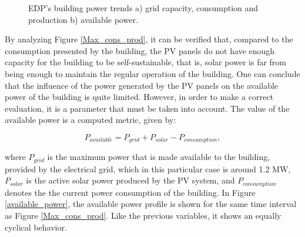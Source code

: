 \begin{figure}[h!]
    \captionsetup[subfigure]{position=b}
    \centering
    \label{fig:ap}
    \caption{EDP's building power trends a) grid capacity, consumption and production b) available power.}
\end{figure}


By analyzing Figure \ref{Max_cons_prod}, it can be verified that, compared to the consumption presented by the building, the \ac{PV} panels do not have enough capacity for the building to be self-sustainable, that is, solar power is far from being enough to maintain the regular operation of the building. One can conclude that the influence of the power generated by the \ac{PV} panels on the available power of the building is quite limited. However, in order to make a correct evaluation, it is a parameter that must be taken into account. The value of the available power is a computed metric, given by:

\begin{equation}
   P_{available} = P_{grid} + P_{solar} - P_{consumption},
   \label{available}
\end{equation}

where $P_{grid}$ is the maximum power that is made available to the building, provided by the electrical grid, which in this particular case is around 1.2 MW, $P_{solar}$ is the active solar power produced by the \ac{PV} system, and $P_{consumption}$ denotes the the current power consumption of the building. In Figure \ref{available_power}, the available power profile is shown for the same time interval as Figure \ref{Max_cons_prod}. Like the previous variables, it shows an equally cyclical behavior.


